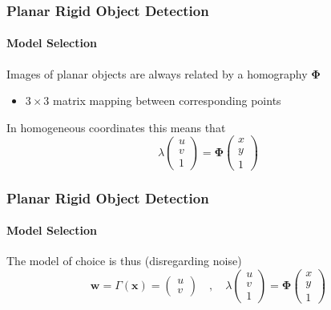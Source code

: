 \documentclass[xetex,professionalfont]{beamer}
\renewcommand{\vec}[1]{\ensuremath{\mathbf{#1}}}
\newcommand{\vw}{\vec{w}}
\newcommand{\vx}{\vec{x}}
\renewcommand\emph[1]{\textcolor{tuwcvl_inf_red}{#1}}
\begin{document}

\begin{frame}
\frametitle{Planar Rigid Object Detection}
\framesubtitle{Model Selection}

Images of planar objects are always related by a \emph{homography} $\boldsymbol{\Phi}$
\begin{itemize}
	\item $3\times3$ matrix mapping between corresponding points
\end{itemize}

\bigskip
In homogeneous coordinates this means that
\[
	\lambda
	\begin{pmatrix}
		u \\ v \\ 1
	\end{pmatrix}
	= \boldsymbol{\Phi}
	\begin{pmatrix}
		x \\ y \\ 1
	\end{pmatrix}
\]

\end{frame}


\begin{frame}
\frametitle{Planar Rigid Object Detection}
\framesubtitle{Model Selection}

The model of choice is thus (disregarding noise)  %
\[
	\vw=\Gamma(\vx)=
	\begin{pmatrix}
		u \\ v
	\end{pmatrix}\quad,\quad
	\lambda
	\begin{pmatrix}
		u \\ v \\ 1
	\end{pmatrix}
	= \boldsymbol{\Phi}
	\begin{pmatrix}
		x \\ y \\ 1
	\end{pmatrix}
\]

\end{frame}

\end{document}
